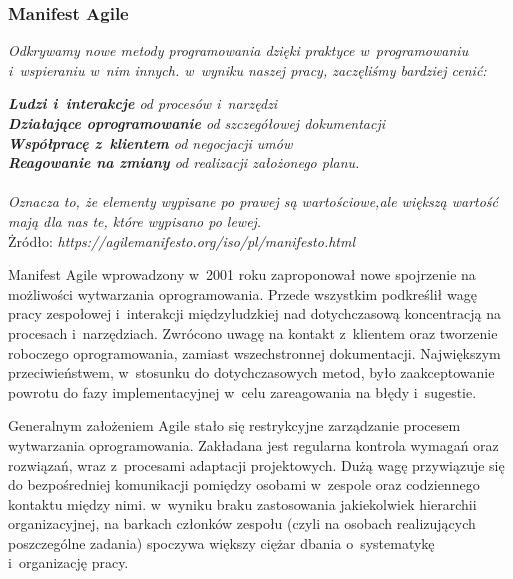 \documentclass[oneside,polski,logo]{amuthesis}
\begin{document}
\subsubsection{Manifest Agile}
\begin{center}
\textit{Odkrywamy nowe metody programowania dzięki praktyce w~programowaniu i~wspieraniu w~nim innych. w~wyniku naszej pracy, zaczęliśmy bardziej cenić:\\}

\textit{\textbf{Ludzi i~interakcje} od procesów i~narzędzi\\}
\textit{\textbf{Działające oprogramowanie} od szczegółowej dokumentacji\\}
\textit{\textbf{Współpracę z~klientem} od negocjacji umów\\}
\textit{\textbf{Reagowanie na zmiany} od realizacji założonego planu.\\ \\}
\textit{Oznacza to, że elementy wypisane po prawej są wartościowe,ale większą wartość mają dla nas te, które wypisano po lewej. \\}
Żródło: \textit{https://agilemanifesto.org/iso/pl/manifesto.html}
\end{center}

Manifest Agile wprowadzony w~2001 roku zaproponował nowe spojrzenie na możliwości wytwarzania oprogramowania. Przede wszystkim podkreślił wagę pracy zespołowej i~interakcji międzyludzkiej nad dotychczasową koncentracją na procesach i~narzędziach. Zwrócono uwagę na kontakt z~klientem oraz tworzenie roboczego oprogramowania, zamiast wszechstronnej dokumentacji. Największym przeciwieństwem, w~stosunku do dotychczasowych metod, było zaakceptowanie powrotu do fazy implementacyjnej w~celu zareagowania na błędy i~sugestie. \cite{agile} \cite{agile2}

Generalnym założeniem Agile stało się restrykcyjne zarządzanie procesem wytwarzania oprogramowania. Zakładana jest regularna kontrola wymagań oraz rozwiązań, wraz z~procesami adaptacji projektowych. Dużą wagę przywiązuje się do bezpośredniej komunikacji pomiędzy osobami w~zespole oraz codziennego kontaktu między nimi. w~wyniku braku zastosowania jakiekolwiek hierarchii organizacyjnej, na barkach członków zespołu (czyli na osobach realizujących poszczególne zadania) spoczywa większy ciężar dbania o~systematykę i~organizację pracy.
\end{document}
